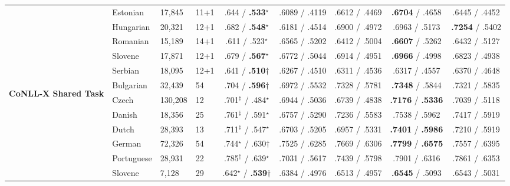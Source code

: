 \begin{table}[ht]
\begin{flushleft}
\begin{tabular}{|@{ }l@{ }|@{ }l@{ }|@{ }l@{ }|@{ }l@{ }|@{ }c@{ }|@{ }c@{ }|@{ }c@{ }|@{ }c@{ }|@{ }c@{ }|}
        & Estonian   & 17,845  & 11+1 & .644 / {\bf.533}$^\star$    & .6089 / .4119 & .6612 / .4469 & {\bf.6704} / .4658     & .6445 / .4452 \\
        & Hungarian  & 20,321  & 12+1 & .682 / {\bf.548}$^\star$    & .6181 / .4514 & .6900 / .4972 & .6963 / .5173     & {\bf.7254} / .5402 \\
        & Romanian   & 15,189  & 14+1 & .611 / .523$^\star$    & .6565 / .5202 & .6412 / .5004 & {\bf .6607} / .5262     & .6432 / .5127 \\
        & Slovene    & 17,871  & 12+1 & .679 / {\bf.567}$^\star$    & .6772 / .5044 & .6914 / .4951 & {\bf .6966} / .4998     & .6823 / .4938 \\
        & Serbian    & 18,095  & 12+1 & .641 / {\bf.510}$\dagger$   & .6267 / .4510 & .6311 / .4536 & .6317 / .4557     & .6370 / .4648 \\
        \hline %
        \multirow{10}{*}{\begin{sideways}\textbf{CoNLL-X Shared Task}\end{sideways}}
        & Bulgarian  & 32,439  & 54   & .704 / {\bf.596}$\dagger$        & .6972 / .5532 & .7328 / .5781  & {\bf.7348} / .5844     & .7321 / .5835 \\
        & Czech      & 130,208 & 12   & .701$^\ddagger$ / .484$^\star$  & .6944 / .5036 & .6739 / .4838  & {\bf.7176} / {\bf.5336}     & .7039 / .5118 \\
        & Danish     & 18,356  & 25   & .761$^\ddagger$ / .591$^\star$ & .6757 / .5290 & .7236 / .5583  & .7538 / .5962     & .7417 / .5919 \\
        & Dutch      & 28,393  & 13   & .711$^\ddagger$ / .547$^\star$ & .6703 / .5205 & .6957 / .5331  & {\bf.7401} / {\bf.5986}     & .7210 / .5919 \\
        & German     & 72,326  & 54   & .744$^\star$ / .630$\dagger$& .7525 / .6285 & .7669 / .6306  & {\bf.7799} / {\bf.6575}     & .7557 / .6395 \\
        & Portuguese & 28,931  & 22   & .785$^\ddagger$ / .639$^\star$ & .7031 / .5617 & .7439 / .5798  & .7901 / .6316     & .7861 / .6353 \\
        & Slovene    & 7,128   & 29   & .642$^\star$ / {\bf.539}$\dagger$    & .6384 / .4976 & .6513 / .4957  & {\bf.6545} / .5093     & .6543 / .5031 \\

\end{tabular}
\end{flushleft}
\end{table}
